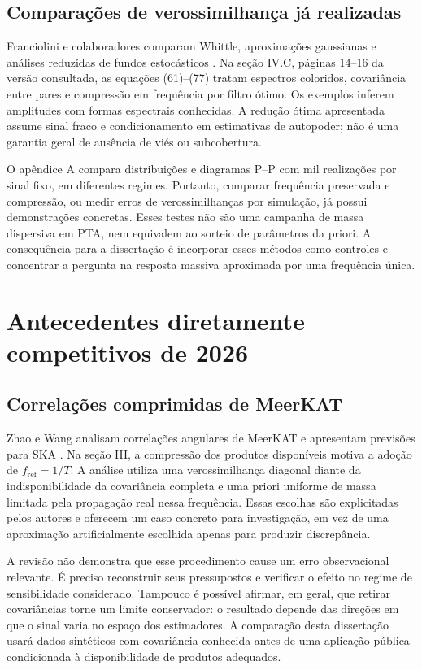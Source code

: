 \subsection{Comparações de verossimilhança já realizadas}

Franciolini e colaboradores comparam Whittle, aproximações gaussianas
e análises reduzidas de fundos estocásticos
\autocite{franciolini2025}. Na seção IV.C, páginas 14--16 da versão
consultada, as equações (61)--(77) tratam espectros coloridos, covariância
entre pares e compressão em frequência por filtro ótimo. Os exemplos
inferem amplitudes com formas espectrais conhecidas. A redução ótima
apresentada assume sinal fraco e condicionamento em estimativas de
autopoder; não é uma garantia geral de ausência de viés ou subcobertura.

O apêndice A compara distribuições e diagramas P--P com mil realizações
por sinal fixo, em diferentes regimes. Portanto, comparar frequência
preservada e compressão, ou medir erros de verossimilhanças por
simulação, já possui demonstrações concretas. Esses testes não são uma
campanha de massa dispersiva em PTA, nem equivalem ao sorteio de
parâmetros da priori. A consequência para a dissertação é incorporar
esses métodos como controles e concentrar a pergunta na resposta
massiva aproximada por uma frequência única.

\section{Antecedentes diretamente competitivos de 2026}

\subsection{Correlações comprimidas de MeerKAT}

Zhao e Wang analisam correlações angulares de MeerKAT e apresentam
previsões para SKA \autocite{zhao2026}. Na seção III, a compressão dos
produtos disponíveis motiva a adoção de
\(f_{\mathrm{ref}}=1/T\). A análise utiliza uma verossimilhança
diagonal diante da indisponibilidade da covariância completa e uma
priori uniforme de massa limitada pela propagação real nessa
frequência. Essas escolhas são explicitadas pelos autores e oferecem
um caso concreto para investigação, em vez de uma aproximação
artificialmente escolhida apenas para produzir discrepância.

A revisão não demonstra que esse procedimento cause um erro
observacional relevante. É preciso reconstruir seus pressupostos e
verificar o efeito no regime de sensibilidade considerado. Tampouco é
possível afirmar, em geral, que retirar covariâncias torne um limite
conservador: o resultado depende das direções em que o sinal varia no
espaço dos estimadores. A comparação desta dissertação usará dados
sintéticos com covariância conhecida antes de uma aplicação pública
condicionada à disponibilidade de produtos adequados.

